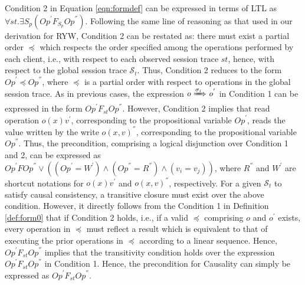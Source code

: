 \documentclass[journal,compsoc]{IEEEtran}
\begin{document}
 Condition 2 in Equation \ref{eqn:formdef} can be expressed in terms of LTL as  $\forall \mathit{st}. \exists S_p \left( \mathit{Op}^{'} F_{S_p} \mathit{Op}^{''} \right)$.  %
  Following the same line of reasoning as that  used in our derivation for RYW, Condition 2 can be restated as: there must exist a partial order $\preccurlyeq$ which respects the order specified among the operations performed by each client, i.e., with respect to each observed session trace $\mathit{st}$, hence, with respect to the global session trace $\mathcal{S}_t$. Thus, Condition 2 reduces to the form ${\mathit{Op}}^{'}  \preccurlyeq {\mathit{Op}}^{''}  $, where $\preccurlyeq$ is a partial order with respect to operations in the global session trace.  
  As in previous cases, the expression $\mathit{o} \xRightarrow{\sigma_i} \mathit{o}^{'}$ in Condition 1 %
  can be expressed in the
 form ${\mathit{Op}}^{'} F_\mathit{st} {\mathit{Op}}^{''}$. %
 However, Condition 2 implies that read operation $\mathit{o}(x){v}^{'}$, corresponding to the propositional variable ${\mathit{Op}}^{'} $, reads the value
 written by the write $\mathit{o}(x,v)^{''}$, corresponding to the propositional variable  ${\mathit{Op}}^{''}$. Thus, the precondition, comprising a logical disjunction over Condition 1 and 2, can be expressed as %
  $ {\mathit{Op}}^{'} F {\mathit{Op}}^{''} \vee
 \left( \left( {\mathit{Op}}^{'} = {W}^{'} \right) \wedge \left( {\mathit{Op}}^{''} = {R}^{''} \right) \wedge
   \left( v_i = v_j \right) \right)$, where $ {R}^{''}$ and $ {W}^{'}$ are shortcut notations for   $\mathit{o}(x){v}^{'}$ and $\mathit{o}(x,v)^{''}$, respectively. For a given $\mathcal{S}_t$ to satisfy causal consistency,  a transitive closure 
must exist over the above condition. %
  However, it directly follows from the Condition 1 in Definition \ref{def:form0} that if Condition 2 holds, i.e., if a valid $\preccurlyeq$ comprising $\mathit{o}$  and $\mathit{o}^{'} $ exists,  every operation in $ \preccurlyeq$ must reflect a result which is equivalent to that of executing the prior operations in $ \preccurlyeq$ according to a linear sequence. Hence, ${\mathit{Op}}^{'} F_\mathit{st} {\mathit{Op}}^{''}$ implies that the transitivity condition holds over the expression ${\mathit{Op}}^{'} F_\mathit{st} {\mathit{Op}}^{''}$  in Condition 1. Hence, the precondition for Causality can simply be expressed as ${\mathit{Op}}^{'}  F_\mathit{st}  {\mathit{Op}}^{''}$. %
\end{document}
